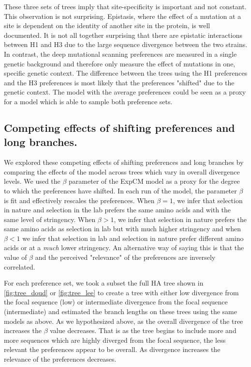 \documentclass[11pt]{article}
\begin{document}
These three sets of trees imply that site-specificity is important and not constant. 
This observation is not surprising. 
Epistasis, where the effect of a mutation at a site is dependent on the identity of another site in the protein, is well documented. 
It is not all together surprising that there are epistatic interactions between H1 and H3 due to the large sequence divergence between the two strains. 
In contrast, the deep mutational scanning preferences are measured in a single genetic background and therefore only measure the effect of mutations in one, specific genetic context.  
The difference between the trees using the H1 preferences and the H3 preferences is most likely that the preferences "shifted" due to the genetic context. 
The model with the average preferences could be seen as a proxy for a model which is able to sample both preference sets. 

\subsection{Competing effects of shifting preferences and long branches.}
We explored these competing effects of shifting preferences and long branches by comparing the effects of the model across trees which vary in overall divergence levels. 
We used the $\beta$ parameter of the ExpCM model as a proxy for the degree to which the preferences have shifted. 
In each run of the model, the parameter $\beta$ is fit and effectively rescales the preferences. 
When $\beta = 1$, we infer that selection in nature and selection in the lab prefers the same amino acids and with the same level of stringency. 
When $\beta > 1$, we infer that selection in nature prefers the same amino acids as selection in lab but with much higher stringency and when $\beta < 1$ we infer that selection in lab and selection in nature prefer different amino acids or at a \textit{much} lower stringency. 
An alternative way of saying this is that the value of $\beta$ and the perceived "relevance" of the preferences are inversely correlated. 

For each preference set, we took a subset the full HA tree shown in \ref{fig:tree_doud} or \ref{fig:tree_lee} to create a tree with either low divergence from the focal sequence (low) or intermediate divergence from the focal sequence (intermediate) and estimated the branch lengths on these trees using the same models as above. 
As we hypothesized above, as the overall divergence of the tree increases the $\beta$ value decreases. 
That is as the tree begins to include more and more sequences which are highly diverged from the focal sequence, the less relevant the preferences appear to be overall. 
As divergence increases the relevance of the preferences decreases. 
\end{document}
